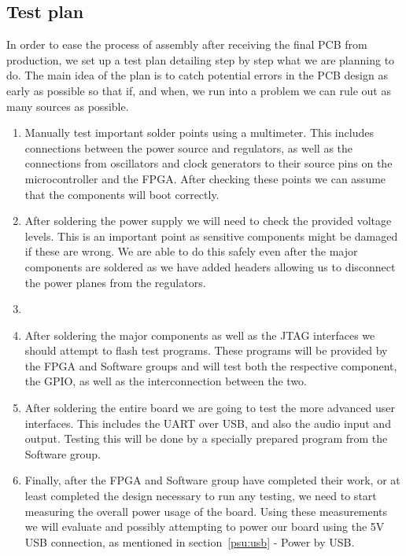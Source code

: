 \subsection{Test plan}

In order to ease the process of assembly after receiving the final PCB from
production, we set up a test plan detailing step by step what we are planning
to do. The main idea of the plan is to catch potential errors in the PCB design
as early as possible so that if, and when, we run into a problem we can rule
out as many sources as possible.

\begin{enumerate}
    \item Manually test important solder points using a multimeter. This includes connections between the power source and regulators, as well as the connections from oscillators and clock generators to their source pins on the microcontroller and the FPGA. After checking these points we can assume that the components will boot correctly.
    \item After soldering the power supply we will need to check the provided voltage levels. This is an important point as sensitive components might be damaged if these are wrong. We are able to do this safely even after the major components are soldered as we have added headers allowing us to disconnect the power planes from the regulators. 
    \item  {}
    \item After soldering the major components as well as the JTAG interfaces we should attempt to flash test programs. These programs will be provided by the FPGA and Software groups and will test both the respective component, the GPIO, as well as the interconnection between the two.
    \item After soldering the entire board we are going to test the more advanced user interfaces. This includes the UART over USB, and also the audio input and output. Testing this will be done by a specially prepared program from the Software group.
    \item Finally, after the FPGA and Software group have completed their work, or at least completed the design necessary to run any testing, we need to start measuring the overall power usage of the board. Using these measurements we will evaluate and possibly attempting to power our board using the 5V USB connection, as mentioned in section~\ref{psu:usb} - Power by USB.
\end{enumerate}

